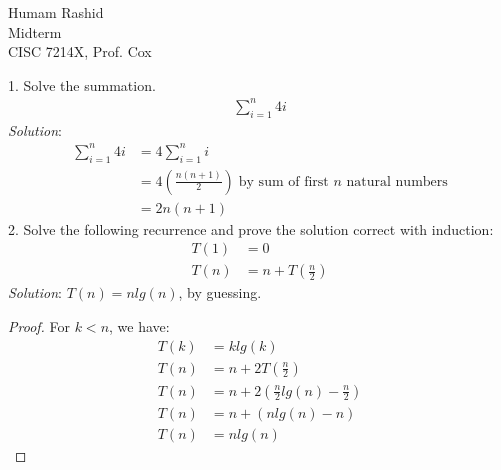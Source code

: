 \documentclass{scrartcl}
\begin{document}
\begin{flushleft}

    Humam Rashid\\
    Midterm\\
    CISC 7214X, Prof. Cox\\
    \bigskip
    
    1. Solve the summation.
    \begin{align*}
        \sum_{i=1}^{n} 4i
    \end{align*}
    \textit{Solution}:
    \begin{align*}
        \sum_{i=1}^{n} 4i &= 4 \sum_{i=1}^{n} i\\
                          &= 4 (\frac{n (n + 1)}{2})\;\text{by sum of first $n$ natural numbers}\\
                          &= 2n(n + 1)
    \end{align*}
    2. Solve the following recurrence and prove the solution correct with induction:
    \begin{align*}
        T(1) &= 0\\
        T(n) &= n + T(\frac{n}{2})
    \end{align*}
    \textit{Solution}: $T(n) = n lg(n)$, by guessing.
    \medskip
    \begin{proof}
        For $k < n$, we have:\\
        \begin{align*}
            T(k) &= k lg(k)\\
            T(n) &= n + 2 T(\frac{n}{2})\\
            T(n) &= n + 2 (\frac{n}{2} lg(n) - \frac{n}{2})\\
            T(n) &= n + (n lg(n) - n)\\
            T(n) &= n lg(n)
        \end{align*}
    \end{proof}

\end{flushleft}
\end{document}
